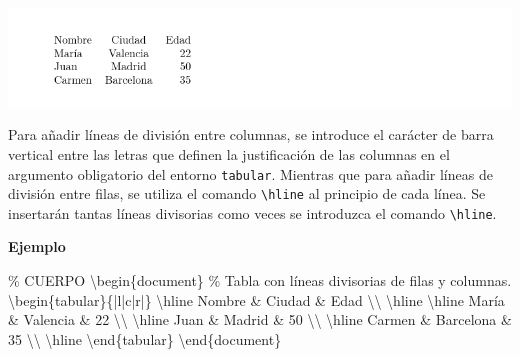 \documentclass[
  a4paper,
]{scrreport}
\newenvironment{Shaded}{\begin{snugshade}}{\end{snugshade}}
\newcommand{\CommentTok}[1]{\textcolor[rgb]{0.37,0.37,0.37}{#1}}
\newcommand{\ExtensionTok}[1]{\textcolor[rgb]{0.00,0.23,0.31}{#1}}
\newcommand{\FunctionTok}[1]{\textcolor[rgb]{0.28,0.35,0.67}{#1}}
\newcommand{\KeywordTok}[1]{\textcolor[rgb]{0.00,0.23,0.31}{#1}}
\newcommand{\NormalTok}[1]{\textcolor[rgb]{0.00,0.23,0.31}{#1}}
\newcommand{\OperatorTok}[1]{\textcolor[rgb]{0.37,0.37,0.37}{#1}}
\begin{document}
\begin{tcolorbox}[enhanced jigsaw, bottomrule=.15mm, leftrule=.75mm, opacityback=0, titlerule=0mm, bottomtitle=1mm, colbacktitle=quarto-callout-note-color!10!white, arc=.35mm, toprule=.15mm, colframe=quarto-callout-note-color-frame, title={Salida}, coltitle=black, colback=white, breakable, toptitle=1mm, rightrule=.15mm, left=2mm, opacitybacktitle=0.6]

\includegraphics{./img/tablas/tabla-simple.png}

\end{tcolorbox}

Para añadir líneas de división entre columnas, se introduce el carácter
de barra vertical \texttt{\textbar{}} entre las letras que definen la
justificación de las columnas en el argumento obligatorio del entorno
\texttt{tabular}. Mientras que para añadir líneas de división entre
filas, se utiliza el comando \texttt{\textbackslash{}hline} al principio
de cada línea. Se insertarán tantas líneas divisorias como veces se
introduzca el comando \texttt{\textbackslash{}hline}.

\textbf{Ejemplo}

\begin{Shaded}
\begin{Highlighting}[]
\CommentTok{\% CUERPO}
\KeywordTok{\textbackslash{}begin}\NormalTok{\{}\ExtensionTok{document}\NormalTok{\}}
\CommentTok{\% Tabla con líneas divisorias de filas y columnas.}
\KeywordTok{\textbackslash{}begin}\NormalTok{\{}\ExtensionTok{tabular}\NormalTok{\}\{|l|c|r|\}}
\FunctionTok{\textbackslash{}hline}
\NormalTok{Nombre }\OperatorTok{\&}\NormalTok{ Ciudad }\OperatorTok{\&}\NormalTok{ Edad }\FunctionTok{\textbackslash{}\textbackslash{}} 
\FunctionTok{\textbackslash{}hline}
\FunctionTok{\textbackslash{}hline}
\NormalTok{María }\OperatorTok{\&}\NormalTok{ Valencia }\OperatorTok{\&}\NormalTok{ 22 }\FunctionTok{\textbackslash{}\textbackslash{}}
\FunctionTok{\textbackslash{}hline}
\NormalTok{Juan }\OperatorTok{\&}\NormalTok{ Madrid }\OperatorTok{\&}\NormalTok{ 50 }\FunctionTok{\textbackslash{}\textbackslash{}}
\FunctionTok{\textbackslash{}hline}
\NormalTok{Carmen }\OperatorTok{\&}\NormalTok{ Barcelona }\OperatorTok{\&}\NormalTok{ 35 }\FunctionTok{\textbackslash{}\textbackslash{}}
\FunctionTok{\textbackslash{}hline}
\KeywordTok{\textbackslash{}end}\NormalTok{\{}\ExtensionTok{tabular}\NormalTok{\}}
\KeywordTok{\textbackslash{}end}\NormalTok{\{}\ExtensionTok{document}\NormalTok{\}}
\end{Highlighting}
\end{Shaded}
\end{document}
